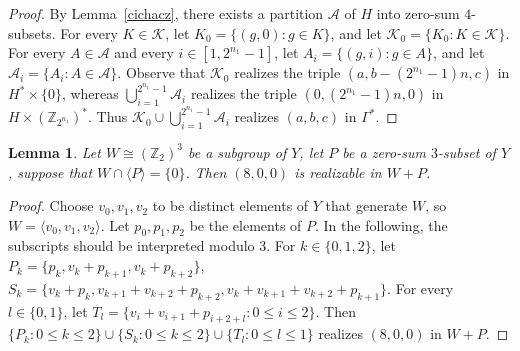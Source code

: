 \documentclass[final]{dmtcs-episciences}
\newcommand{\comS}[1]{{\color{olive} (Komentarz: #1)}}
\newcommand{\edtS}[1]{{\color{olive} #1}}
\newtheorem{lem}[thm]{Lemma}
\newcommand{\zet}{\mathbb{Z}}
\begin{document}
\begin{proof} 
By Lemma~\ref{cichacz}, there exists a partition $\mathcal{A}$ of $H$ into zero-sum $4$-subsets. For every $K \in \mathcal{K}$, let $K_0 = \{(g,0) : g\in K\}$, and let $\mathcal{K}_0 = \{K_0 \colon K \in \mathcal{K}\}$. For every $A \in \mathcal{A}$ and every  {$i\in[1, 2^{n_1}-1]$}, let $A_i = \{(g,i) \colon g \in A\}$, and let $\mathcal{A}_i = \{A_i \colon A \in \mathcal{A}\}$. Observe that $\mathcal{K}_0$ realizes the triple $(a, b-(2^{n_1}-1)n, c)$ in $H^*\times\{0\}$, whereas $\bigcup_{i=1}^{2^{n_1}-1}\mathcal{A}_{i}$ realizes the triple $(0, (2^{n_1}-1)n,0)$ in $H\times (\zet_{2^{n_1}})^*$. Thus $\mathcal{K}_0 \cup \bigcup_{i=1}^{2^{n_1}-1}\mathcal{A}_{i}$ realizes $(a, b, c)$ in $\Gamma^*$.
\end{proof}



\begin{lem}\label{l3.8} Let $W\cong(\zet_2)^3$ be a subgroup of $Y$, let $P$ be a zero-sum $3$-subset of $Y$, suppose that $W\cap\langle P\rangle=\{0\}$. Then $(8,0,0)$ is realizable in $W+P$.
\end{lem}
\begin{proof}
Choose $v_0, v_{1}, v_{2}$ to be distinct elements of $Y$ that generate $W$, so $W=\langle v_0,v_{1},v_{2}\rangle$. Let $p_0,p_{1},p_{2}$ be the elements of $P$. In the following, the  subscripts should be interpreted modulo 3. For  $k\in\{0,1,2\}$, let
$P_{k}=\{p_{k}, v_{k}+p_{k+1}, v_{k}+p_{k+2}\}$,
$S_{k}=\{v_{k}+p_{k}, v_{k+1}+v_{k+2}+p_{k+2}, v_{k}+v_{k+1}+v_{k+2}+p_{k+1}\}$.
For every $l\in\{0,1\}$, let
$T_{l}=\{v_{i}+v_{i+1}+p_{i+2+l}\colon0\leq i\leq 2\}$.
Then $\{P_{k} : 0\leq k \leq 2\} \cup \{S_{k} : 0\leq k \leq 2\} \cup \{T_{l} : 0 \leq l \leq 1\}$ realizes $(8, 0,0)$ in $W+P$.
\end{proof}
\end{document}
